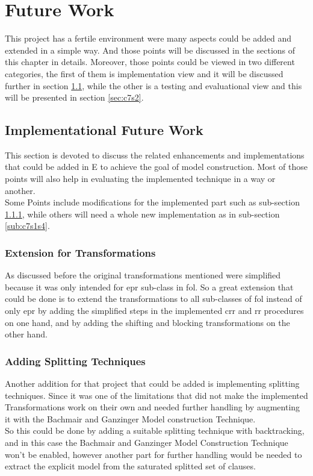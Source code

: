 \chapter{Future Work}\label{chap:todo}
This project has a fertile environment were many aspects could be added and extended in a simple way.
And those points will be discussed in the sections of this chapter in details. Moreover, those points could be viewed in two different categories, the first of them is implementation view and it will be discussed further in section \ref{sec:c7s1}, while the other is a testing and evaluational view and this will be presented in section \ref{sec:c7s2}. 

	\section{Implementational Future Work}\label{sec:c7s1}
	This section is devoted to discuss the related enhancements and implementations that could be added in E to achieve the goal of model construction. Most of those points will also help in evaluating the implemented technique in a way or another.
\\
Some Points include modifications for the implemented part such as sub-section \ref{sub:c7s1s1}, while others will need a whole new implementation as in sub-section \ref{sub:c7s1s4}.    

		\subsection{Extension for Transformations}\label{sub:c7s1s1}
		As discussed before the original transformations mentioned were simplified because it was only intended for \ac{epr} sub-class in \ac{fol}. So a great extension that could be done is to extend the transformations to all sub-classes of \ac{fol} instead of only \ac{epr} by adding the simplified steps in the implemented crr and rr procedures on one hand, and by adding the shifting and blocking transformations on the other hand.

		\subsection{Adding Splitting Techniques}\label{sub:c7s1s2}
		Another addition for that project that could be added is implementing splitting techniques. Since it was one of the limitations that did not make the implemented Transformations work on their own and needed further handling by augmenting it with the Bachmair and Ganzinger Model construction Technique.
\\
		So this could be done by adding a suitable splitting technique with backtracking, and in this case the Bachmair and Ganzinger Model Construction Technique won't be enabled, however another part for further handling would be needed to extract the explicit model from the saturated splitted set of clauses.  


